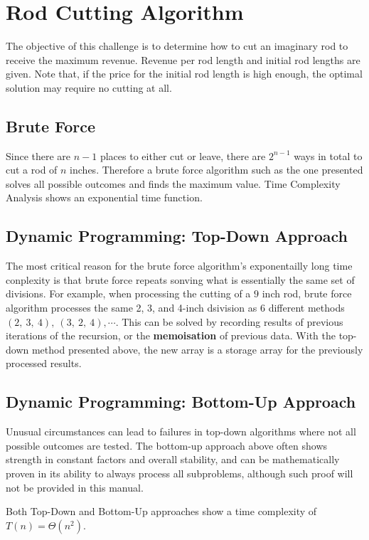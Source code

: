 \chapter{Rod Cutting Algorithm}
The objective of this challenge is to determine how to cut an imaginary rod to
receive the maximum revenue. Revenue per rod length and initial rod lengths are
given. Note that, if the price for the initial rod length is high enough, the
optimal solution may require no cutting at all.

\section{Brute Force}

Since there are $n-1$ places to either cut or leave, there are $2^{n-1}$ ways in
total to cut a rod of $n$ inches. Therefore a brute force algorithm such as the
one presented solves all possible outcomes and finds the maximum value. Time
Complexity Analysis shows an exponential time function.
\newpage

\section{Dynamic Programming: Top-Down Approach}

The most critical reason for the brute force algorithm's exponentailly long time
conplexity is that brute force repeats sonving what is essentially the same set
of divisions. For example, when processing the cutting of a $9$ inch rod, brute
force algorithm processes the same 2, 3, and 4-inch dsivision as 6 different
methods $(2,~3,~4),~(3,~2,~4),\cdots$. This can be solved by recording results
of previous iterations of the recursion, or the \textbf{memoisation} of previous
data. With the top-down method presented above, the new array  is
a storage array for the previously processed results.

\section{Dynamic Programming: Bottom-Up Approach}

Unusual circumstances can lead to failures in top-down algorithms where not all
possible outcomes are tested. The bottom-up approach above often shows strength
in constant factors and overall stability, and can be mathematically proven in
its ability to always process all subproblems, although such proof will not be
provided in this manual.

Both Top-Down and Bottom-Up approaches show a time complexity of $T(n)=\Theta
\left(n^2\right)$.
